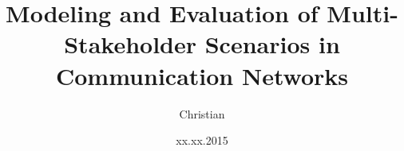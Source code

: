 \documentclass[pdf]{diss}
\date{xx.xx.2015}
\author{Christian}{Schwartz}
\title{Modeling and Evaluation of Multi-Stakeholder Scenarios in Communication Networks}
\renewcommand{\baselinestretch}{1.25}\normalsize
\let\oldbls=\baselinestretch
\begin{document}
\nocite{Nguyen2013,Schwartz2013a,Hock2011,Schwartz2014a,Hirth2014a,Burger2014a,Schwartz2013b,Schwartz2013c,Schwartz2012a,Hock2010a,Hock2010b,Hock2010c,Hartmann2009a,Hock2011a}

\setcounter{tocdepth}{4} 

\clearpage








\renewcommand{\baselinestretch}{\oldbls}\normalsize



\renewcommand{\bibname}{Bibliography and References}

\vspace{-1cm}

\end{document}
